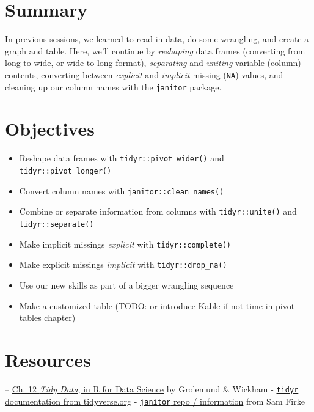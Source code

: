\documentclass[]{book}
\providecommand{\tightlist}{%
  \setlength{\itemsep}{0pt}\setlength{\parskip}{0pt}}
\begin{document}
\hypertarget{summary-4}{%
\section{Summary}\label{summary-4}}

In previous sessions, we learned to read in data, do some wrangling, and create a graph and table. Here, we'll continue by \emph{reshaping} data frames (converting from long-to-wide, or wide-to-long format), \emph{separating} and \emph{uniting} variable (column) contents, converting between \emph{explicit} and \emph{implicit} missing (\texttt{NA}) values, and cleaning up our column names with the \texttt{janitor} package.

\hypertarget{objectives-3}{%
\section{Objectives}\label{objectives-3}}

\begin{itemize}
\tightlist
\item
  Reshape data frames with \texttt{tidyr::pivot\_wider()} and \texttt{tidyr::pivot\_longer()}
\item
  Convert column names with \texttt{janitor::clean\_names()}
\item
  Combine or separate information from columns with \texttt{tidyr::unite()} and \texttt{tidyr::separate()}
\item
  Make implicit missings \emph{explicit} with \texttt{tidyr::complete()}
\item
  Make explicit missings \emph{implicit} with \texttt{tidyr::drop\_na()}
\item
  Use our new skills as part of a bigger wrangling sequence
\item
  Make a customized table (TODO: or introduce Kable if not time in pivot tables chapter)
\end{itemize}

\hypertarget{resources-6}{%
\section{Resources}\label{resources-6}}

-- \href{https://r4ds.had.co.nz/tidy-data.html}{Ch. 12 \emph{Tidy Data}, in R for Data Science} by Grolemund \& Wickham
- \href{https://tidyr.tidyverse.org/}{\texttt{tidyr} documentation from tidyverse.org}
- \href{https://github.com/sfirke/janitor}{\texttt{janitor} repo / information} from Sam Firke
\end{document}
